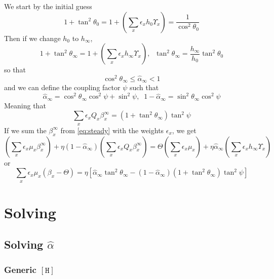 \documentclass[aps,onecolumn,10pt]{revtex4}
\newcommand{\mychem}[1]{\mathtt{#1}}
\newcommand{\myconc}[1]{\left\lbrack{#1}\right\rbrack}
\newcommand{\spproton}{\mychem{H}}
\newcommand{\proton}{\myconc{\spproton}}
\begin{document}
\color{RedViolet}
We start by the initial guess
\begin{equation}
\boxed{
	1+\tan^2\theta_0 = 1+\left(\sum_x \epsilon_x h_0 \Upsilon_x \right) = \dfrac{1}{\cos^2\theta_0}
	}
\end{equation}
Then if we change $h_0$ to $h_\infty$,
\begin{equation}
\boxed{
	1+\tan^2\theta_\infty = 1+\left(\sum_x \epsilon_x h_\infty \Upsilon_x \right),\;\;\tan^2\theta_\infty=\dfrac{h_\infty}{h_0} \tan^2\theta_0
	}
\end{equation}
so that
\begin{equation}
	\cos^2\theta_\infty \leq \hat\alpha_\infty < 1
\end{equation}
and we can define the coupling factor $\psi$ such that
\begin{equation}
\boxed{
	\hat\alpha_\infty = \cos^2\theta_\infty \cos^2 \psi + \sin^2\psi,\;\;1-\hat\alpha_\infty=\sin^2\theta_\infty \cos^2\psi
	}
\end{equation}
Meaning that
\begin{equation}
\boxed{
	\sum_x \epsilon_x Q_x \beta_x^\infty = (1+\tan^2\theta_\infty) \tan^2 \psi
	}
\end{equation}
If we sum the $\beta_x^\infty$ from \eqref{eq:steady} with the weights $\epsilon_x$, we get
\begin{equation}
	\left(\sum_x \epsilon_x \mu_x \beta_x^\infty \right) + \eta \left(1-\hat\alpha_\infty\right) \left(\sum_x\epsilon_x Q_x \beta_x^\infty\right)
	= \Theta \left(\sum_x \epsilon_x\mu_x\right) + \eta \hat\alpha_\infty \left(\sum_x \epsilon_x h_\infty \Upsilon_x \right)
\end{equation}
or
\begin{equation}
	\sum_x\epsilon_x \mu_x \left(\beta_x-\Theta\right)  = \eta \left[ \hat\alpha_\infty\tan^2\theta_\infty - (1-\hat\alpha_\infty) (1+\tan^2\theta_\infty) \tan^2 \psi\right] 
\end{equation}



\section{Solving}
\color{blue}
\subsection{Solving $\hat\alpha$}

\subsubsection{Generic $\proton$}
\end{document}
